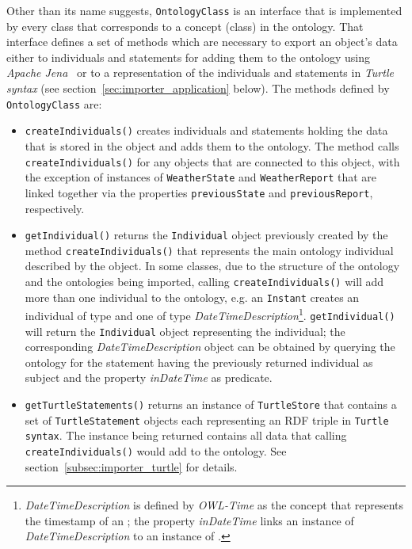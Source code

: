 Other than its name suggests, \texttt{OntologyClass} is an interface that is implemented by every class that corresponds to a concept (class) in the ontology. That interface defines a set of methods which are necessary to export an object's data either to individuals and statements for adding them to the ontology using \emph{Apache Jena}~\cite{apache_jena} or to a representation of the individuals and statements in \emph{Turtle syntax} (see section~\ref{sec:importer_application} below). The methods defined by \texttt{OntologyClass} are:
\begin{itemize}
  \item \texttt{createIndividuals()} creates individuals and statements holding the data that is stored in the object and adds them to the ontology. The method calls \texttt{createIndividuals()} for any objects that are connected to this object, with the exception of instances of \texttt{WeatherState} and \texttt{WeatherReport} that are linked together via the properties \texttt{previousState} and \texttt{previousReport}, respectively.
  
  \item \texttt{getIndividual()} returns the \texttt{Individual} object previously created by the method \texttt{createIndividuals()} that represents the main ontology individual described by the object. In some classes, due to the structure of the \smarthomeweather ontology and the ontologies being imported, calling \texttt{createIndividuals()} will add more than one individual to the ontology, e.g. an \texttt{Instant} creates an individual of type  and one of type \emph{DateTimeDescription}\footnote{\emph{DateTimeDescription} is defined by \emph{OWL-Time} as the concept that represents the timestamp of an ; the property \emph{inDateTime} links an instance of \emph{DateTimeDescription} to an instance of .}. \texttt{getIndividual()} will return the \texttt{Individual} object representing the  individual; the corresponding \emph{DateTimeDescription} object can be obtained by querying the ontology for the statement having the previously returned
   individual as subject and the property \emph{inDateTime} as predicate.
  
  \item \texttt{getTurtleStatements()} returns an instance of \texttt{TurtleStore} that contains a set of \texttt{TurtleStatement} objects each representing an RDF triple in \texttt{Turtle syntax}. The instance being returned contains all data that calling \texttt{createIndividuals()} would add to the ontology. See section~\ref{subsec:importer_turtle} for details.
  

\end{itemize}
